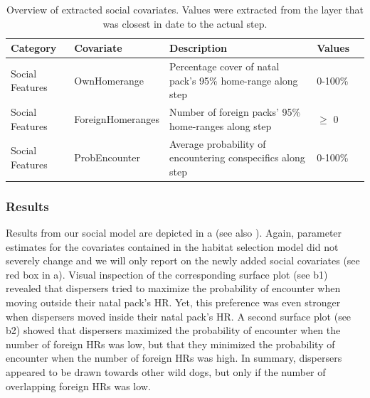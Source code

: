 \documentclass[abstract=on,10pt,a4paper,bibliography=totocnumbered]{scrartcl}
\begin{document}
\begin{table}[h]
  \begin{center}
    \caption{Overview of extracted social covariates. Values were extracted from
    the layer that was closest in date to the actual step.}
    \label{SocialCovars}
    \resizebox{\textwidth}{!} {
      \begin{tabular}{lllll}
      \hline
      \textbf{Category} &
        \textbf{Covariate} &
          \textbf{Description} &
            \textbf{Values} \\
      \midrule
      Social Features
        & OwnHomerange
          & Percentage cover of natal pack’s 95\% home-range along step
            & 0-100\% \\
      Social Features
        & ForeignHomeranges
          & Number of foreign packs’ 95\% home-ranges along step
            & \(\geq\) 0 \\
      Social Features
        & ProbEncounter
          & Average probability of encountering conspecifics along step
            & 0-100\% \\
      \hline
      \end{tabular}
    }
  \end{center}
\end{table}

\newpage
\subsubsection{Results}
Results from our social model are depicted in a (see also
). Again, parameter estimates for the covariates
contained in the habitat selection model did not severely change and we will
only report on the newly added social covariates (see red box in
a). Visual inspection of the corresponding surface plot (see
b1) revealed that dispersers tried to maximize the probability
of encounter when moving outside their natal pack's HR. Yet, this preference was
even stronger when dispersers moved inside their natal pack's HR. A second
surface plot (see b2) showed that dispersers maximized the
probability of encounter when the number of foreign HRs was low, but that they
minimized the probability of encounter when the number of foreign HRs was high.
In summary, dispersers appeared to be drawn towards other wild dogs, but only if
the number of overlapping foreign HRs was low.
\end{document}
